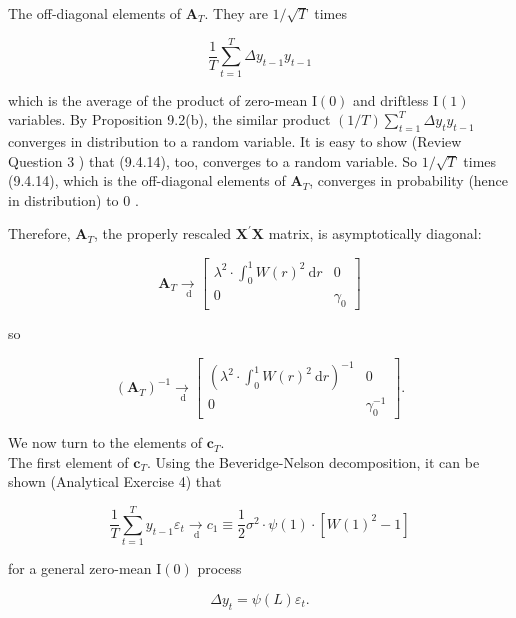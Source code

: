 \documentclass[10pt]{article}
\begin{document}
The off-diagonal elements of $\mathbf{A}_{T}$. They are $1 / \sqrt{T}$ times


\begin{equation*}
\frac{1}{T} \sum_{t=1}^{T} \Delta y_{t-1} y_{t-1} \tag{9.4.14}
\end{equation*}


which is the average of the product of zero-mean $\mathrm{I}(0)$ and driftless $\mathrm{I}(1)$ variables. By Proposition 9.2(b), the similar product $(1 / T) \sum_{t=1}^{T} \Delta y_{t} y_{t-1}$ converges in distribution to a random variable. It is easy to show (Review Question 3 ) that (9.4.14), too, converges to a random variable. So $1 / \sqrt{T}$ times (9.4.14), which is the off-diagonal elements of $\mathbf{A}_{T}$, converges in probability (hence in distribution) to 0 .

Therefore, $\mathbf{A}_{T}$, the properly rescaled $\mathbf{X}^{\prime} \mathbf{X}$ matrix, is asymptotically diagonal:

$$
\mathbf{A}_{T} \underset{\mathrm{~d}}{\rightarrow}\left[\begin{array}{cc}
\lambda^{2} \cdot \int_{0}^{1} W(r)^{2} \mathrm{~d} r & 0 \\
0 & \gamma_{0}
\end{array}\right]
$$

so

\[
\left(\mathbf{A}_{T}\right)^{-1} \underset{\mathrm{~d}}{\rightarrow}\left[\begin{array}{cc}
\left(\lambda^{2} \cdot \int_{0}^{1} W(r)^{2} \mathrm{~d} r\right)^{-1} & 0  \tag{9.4.15}\\
0 & \gamma_{0}^{-1}
\end{array}\right] .
\]

We now turn to the elements of $\mathbf{c}_{T}$.\\
The first element of $\mathbf{c}_{T}$. Using the Beveridge-Nelson decomposition, it can be shown (Analytical Exercise 4) that


\begin{equation*}
\frac{1}{T} \sum_{t=1}^{T} y_{t-1} \varepsilon_{t} \underset{\mathrm{~d}}{\rightarrow} c_{1} \equiv \frac{1}{2} \sigma^{2} \cdot \psi(1) \cdot\left[W(1)^{2}-1\right] \tag{9.4.16}
\end{equation*}


for a general zero-mean $\mathrm{I}(0)$ process


\begin{equation*}
\Delta y_{t}=\psi(L) \varepsilon_{t} . \tag{9.4.17}
\end{equation*}
\end{document}
